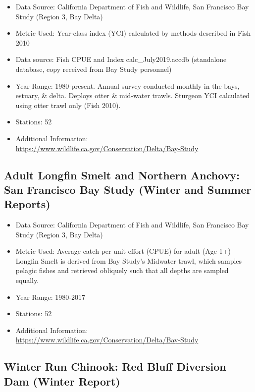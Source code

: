 \documentclass[
]{book}
\providecommand{\tightlist}{%
  \setlength{\itemsep}{0pt}\setlength{\parskip}{0pt}}
\begin{document}
\begin{itemize}
\tightlist
\item
  Data Source: California Department of Fish and Wildlife, San Francisco Bay Study (Region 3, Bay Delta)
\item
  Metric Used: Year-class index (YCI) calculated by methods described in Fish 2010
\item
  Data source: Fish CPUE and Index calc\_July2019.accdb (standalone database, copy received from Bay Study personnel)
\item
  Year Range: 1980-present. Annual survey conducted monthly in the bays, estuary, \& delta. Deploys otter \& mid-water trawls. Sturgeon YCI calculated using otter trawl only (Fish 2010).
\item
  Stations: 52
\item
  Additional Information: \url{https://www.wildlife.ca.gov/Conservation/Delta/Bay-Study}
\end{itemize}

\hypertarget{adult-longfin-smelt-and-northern-anchovy-san-francisco-bay-study-winter-and-summer-reports}{%
\subsection{Adult Longfin Smelt and Northern Anchovy: San Francisco Bay Study (Winter and Summer Reports)}\label{adult-longfin-smelt-and-northern-anchovy-san-francisco-bay-study-winter-and-summer-reports}}

\begin{itemize}
\tightlist
\item
  Data Source: California Department of Fish and Wildlife, San Francisco Bay Study (Region 3, Bay Delta)
\item
  Metric Used: Average catch per unit effort (CPUE) for adult (Age 1+) Longfin Smelt is derived from Bay Study's Midwater trawl, which samples pelagic fishes and retrieved obliquely such that all depths are sampled equally.
\item
  Year Range: 1980-2017
\item
  Stations: 52
\item
  Additional Information: \url{https://www.wildlife.ca.gov/Conservation/Delta/Bay-Study}
\end{itemize}

\hypertarget{winter-run-chinook-red-bluff-diversion-dam-winter-report}{%
\subsection{Winter Run Chinook: Red Bluff Diversion Dam (Winter Report)}\label{winter-run-chinook-red-bluff-diversion-dam-winter-report}}
\end{document}
